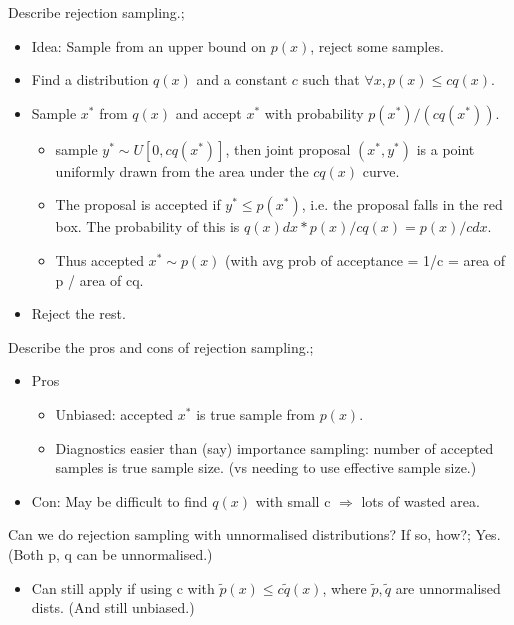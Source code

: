 \documentclass{article}
\begin{document}
Describe rejection sampling.; \begin{itemize}
    \item Idea: Sample from an upper bound on $p(x)$, reject some samples.
    \item Find a distribution $q(x)$ and a constant $c$ such that $\forall x, p(x) \leq cq(x)$.
    \item Sample $x^*$ from $q(x)$ and accept $x^*$ with probability $p(x^*)/(cq(x^*))$.
    \begin{itemize}
        \item sample $y^* \sim U[0, cq(x^*)]$, then joint proposal $(x^*, y^*)$ is a point uniformly drawn from the area under the $cq(x)$ curve.
        \item The proposal is accepted if $y^* \leq p(x^*)$, i.e. the proposal falls in the red box. The probability of this is $q(x)dx * p(x) / cq(x) = p(x)/c dx$.
        \item Thus accepted $x^* \sim p(x)$ (with avg prob of acceptance = 1/c = area of p / area of cq.
    \end{itemize}
    \item Reject the rest.
\end{itemize}

Describe the pros and cons of rejection sampling.; \begin{itemize}
    \item Pros
    \begin{itemize}
        \item Unbiased: accepted $x^*$ is true sample from $p(x)$.
        \item Diagnostics easier than (say) importance sampling: number of accepted samples is true sample size. (vs needing to use effective sample size.)
    \end{itemize}
    \item Con: May be difficult to find $q(x)$ with small c $\Rightarrow$ lots of wasted area.
\end{itemize}

Can we do rejection sampling with unnormalised distributions? If so, how?; Yes. (Both p, q can be unnormalised.) \begin{itemize}
    \item Can still apply if using c with $\tilde{p}(x) \leq c\tilde{q}(x)$, where $\tilde{p}, \tilde{q}$ are unnormalised dists. (And still unbiased.)
\end{itemize}
\end{document}
